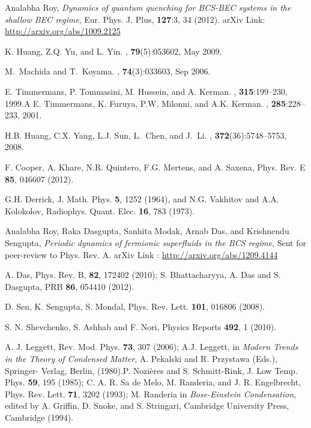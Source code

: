 \documentclass[a4paper,10pt]{report}
\begin{document}
\begin{thebibliography}{10}
\newblock Analabha Roy, 
\newblock \textit{Dynamics of quantum quenching for BCS-BEC systems in the shallow BEC regime}, 
\newblock Eur. Phys. J. Plus, {\bf 127}:3, 34 (2012).
\newblock arXiv Link: \url{http://arxiv.org/abs/1009.2125}

\newblock K. Huang, Z.Q. Yu, and L. Yin.
, \textbf{79}(5):053602, May 2009.

\newblock M.~Machida and T.~Koyama.
, \textbf{74}(3):033603, Sep 2006.

E. Timmermans, P. Tommasini, M. Hussein, and A. Kerman.
, \textbf{315}:199--230, 1999.A
\newblock E. Timmermans, K. Furuya, P.W. Milonni, and A.K. Kerman.
, \textbf{285}:228--233, 2001.

H.B. Huang, C.X. Yang, L.J. Sun, L.~Chen, and J.~Li.
, \textbf{372}(36):5748--5753, 2008.

\newblock F. Cooper, A. Khare, N.R. Quintero, F.G. Mertens, and A. Saxena,
\newblock Phys. Rev. E {\bf 85}, 046607 (2012).

\newblock G.H. Derrick, J. Math. Phys. {\bf 5}, 1252 (1964), and
\newblock N.G. Vakhitov and A.A. Kolokolov, Radiophys. Quant. Elec. {\bf 16}, 783 (1973).

\newblock Analabha Roy, Raka Dasgupta, Sanhita Modak, Arnab Das, and Krishnendu Sengupta, 
\newblock \textit{Periodic dynamics of fermionic superfluids in the BCS regime},
\newblock Sent for peer-review to Phys. Rev. A.
\newblock arXiv Link : \url{http://arxiv.org/abs/1209.4144}

 A. Das, Phys. Rev. B, {\bf 82}, 172402 (2010); S. Bhattacharyya, A. Das and S. Dasgupta, PRB {\bf 86}, 054410 (2012).

 D. Sen, K. Sengupta, S. Mondal, Phys. Rev. Lett. \textbf{101}, 016806 (2008).

 S. N. Shevchenko, S. Ashhab and F. Nori, Physics Reports {\bf 492}, 1 (2010).

 A. J. Leggett, Rev. Mod. Phys. {\bf 73}, 307
(2006); A.J. Leggett, in {\it Modern Trends in the Theory of
Condensed Matter}, A. Pekalski and R. Przystawa (Eds.), Springer-
Verlag, Berlin, (1980).P. Nozières and S. Schmitt-Rink, J. Low Temp.
Phys. {\bf 59}, 195 (1985); C. A. R. Sa de Melo, M. Randeria, and J.
R. Engelbrecht, Phys. Rev. Lett. {\bf 71}, 3202 (1993); M. Randeria
in {\it Bose-Einstein Condensation}, edited by A. Griffin, D. Snoke,
and S. Stringari, Cambridge University Press, Cambridge (1994).


\end{thebibliography}
\end{document}
